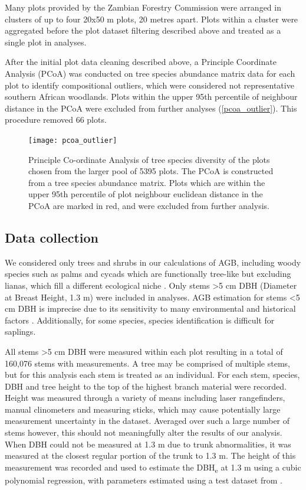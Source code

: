 \documentclass[11pt,a4paper]{article}
\begin{document}
Many plots provided by the Zambian Forestry Commission were arranged in clusters of up to four 20x50 m plots, 20 metres apart. Plots within a cluster were aggregated before the plot dataset filtering described above and treated as a single plot in analyses.

After the initial plot data cleaning described above, a Principle Coordinate Analysis (PCoA) was conducted on tree species abundance matrix data for each plot to identify compositional outliers, which were considered not representative southern African woodlands. Plots within the upper 95th percentile of neighbour distance in the PCoA were excluded from further analyses (\autoref{pcoa_outlier}). This procedure removed 66 plots.

\begin{figure}[H]
\centering
	\texttt{[image: pcoa\_outlier]}
	\caption{Principle Co-ordinate Analysis of tree species diversity of the \nplotspcoa{} plots chosen from the larger pool of 5395 plots. The PCoA is constructed from a tree species abundance matrix. Plots which are within the upper 95th percentile of plot neighbour euclidean distance in the PCoA are marked in red, and were excluded from further analysis.}
	\label{pcoa_outlier}
\end{figure}

\subsection{Data collection}
 
We considered only trees and shrubs in our calculations of AGB, including woody species such as palms and cycads which are functionally tree-like but excluding lianas, which fill a different ecological niche \citep{}. Only stems >5 cm DBH (Diameter at Breast Height, 1.3 m) were included in analyses. AGB estimation for stems <5 cm DBH is imprecise due to its sensitivity to many environmental and historical factors \citep{}. Additionally, for some species, species identification is difficult for saplings.


All stems >5 cm DBH were measured within each plot resulting in a total of 160,076 stems with measurements. A tree may be comprised of multiple stems, but for this analysis each stem is treated as an individual. For each stem, species, DBH and tree height to the top of the highest branch material were recorded. Height was measured through a variety of means including laser rangefinders, manual clinometers and measuring sticks, which may cause potentially large measurement uncertainty in the dataset. Averaged over such a large number of stems however, this should not meaningfully alter the results of our analysis. When DBH could not be measured at 1.3 m due to trunk abnormalities, it was measured at the closest regular portion of the trunk to 1.3 m. The height of this measurement was recorded and used to estimate the DBH\textsubscript{e} at 1.3 m using a cubic polynomial regression, with parameters estimated using a test dataset from \citet{Ryanunbublished}.
\end{document}
